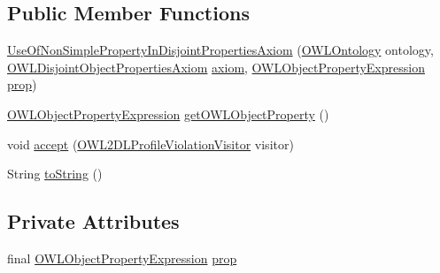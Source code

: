 \subsection*{Public Member Functions}
\begin{DoxyCompactItemize}
\item 
\hyperlink{classorg_1_1semanticweb_1_1owlapi_1_1profiles_1_1_use_of_non_simple_property_in_disjoint_properties_axiom_a5b2dec5487a95850693a343d048c6163}{Use\-Of\-Non\-Simple\-Property\-In\-Disjoint\-Properties\-Axiom} (\hyperlink{interfaceorg_1_1semanticweb_1_1owlapi_1_1model_1_1_o_w_l_ontology}{O\-W\-L\-Ontology} ontology, \hyperlink{interfaceorg_1_1semanticweb_1_1owlapi_1_1model_1_1_o_w_l_disjoint_object_properties_axiom}{O\-W\-L\-Disjoint\-Object\-Properties\-Axiom} \hyperlink{classorg_1_1semanticweb_1_1owlapi_1_1profiles_1_1_o_w_l_profile_violation_aa7c8e8910ed3966f64a2c003fb516214}{axiom}, \hyperlink{interfaceorg_1_1semanticweb_1_1owlapi_1_1model_1_1_o_w_l_object_property_expression}{O\-W\-L\-Object\-Property\-Expression} \hyperlink{classorg_1_1semanticweb_1_1owlapi_1_1profiles_1_1_use_of_non_simple_property_in_disjoint_properties_axiom_a30b93e16320f5315fe4f2798f25cb8bc}{prop})
\item 
\hyperlink{interfaceorg_1_1semanticweb_1_1owlapi_1_1model_1_1_o_w_l_object_property_expression}{O\-W\-L\-Object\-Property\-Expression} \hyperlink{classorg_1_1semanticweb_1_1owlapi_1_1profiles_1_1_use_of_non_simple_property_in_disjoint_properties_axiom_addc0f6b44ad7861e2571efb80c1475c6}{get\-O\-W\-L\-Object\-Property} ()
\item 
void \hyperlink{classorg_1_1semanticweb_1_1owlapi_1_1profiles_1_1_use_of_non_simple_property_in_disjoint_properties_axiom_a0f39891cbafc7dd90a22282fc65d1c35}{accept} (\hyperlink{interfaceorg_1_1semanticweb_1_1owlapi_1_1profiles_1_1_o_w_l2_d_l_profile_violation_visitor}{O\-W\-L2\-D\-L\-Profile\-Violation\-Visitor} visitor)
\item 
String \hyperlink{classorg_1_1semanticweb_1_1owlapi_1_1profiles_1_1_use_of_non_simple_property_in_disjoint_properties_axiom_a540d8646f8374b81c6e50913c60ca1c3}{to\-String} ()
\end{DoxyCompactItemize}
\subsection*{Private Attributes}
\begin{DoxyCompactItemize}
\item 
final \hyperlink{interfaceorg_1_1semanticweb_1_1owlapi_1_1model_1_1_o_w_l_object_property_expression}{O\-W\-L\-Object\-Property\-Expression} \hyperlink{classorg_1_1semanticweb_1_1owlapi_1_1profiles_1_1_use_of_non_simple_property_in_disjoint_properties_axiom_a30b93e16320f5315fe4f2798f25cb8bc}{prop}
\end{DoxyCompactItemize}


